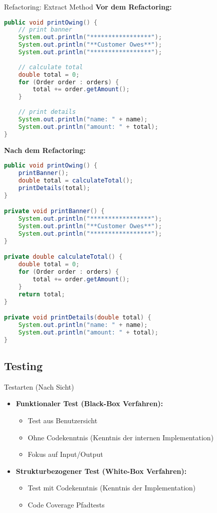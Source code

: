 \begin{example2}{Refactoring: Extract Method}
\textbf{Vor dem Refactoring:}
\begin{lstlisting}[language=Java, style=basesmol]
public void printOwing() {
    // print banner
    System.out.println("*****************");
    System.out.println("**Customer Owes**");
    System.out.println("*****************");
    
    // calculate total
    double total = 0;
    for (Order order : orders) {
        total += order.getAmount();
    }
    
    // print details
    System.out.println("name: " + name);
    System.out.println("amount: " + total);
}
\end{lstlisting}

\textbf{Nach dem Refactoring:}
\begin{lstlisting}[language=Java, style=basesmol]
public void printOwing() {
    printBanner();
    double total = calculateTotal();
    printDetails(total);
}

private void printBanner() {
    System.out.println("*****************");
    System.out.println("**Customer Owes**");
    System.out.println("*****************");
}

private double calculateTotal() {
    double total = 0;
    for (Order order : orders) {
        total += order.getAmount();
    }
    return total;
}

private void printDetails(double total) {
    System.out.println("name: " + name);
    System.out.println("amount: " + total);
}
\end{lstlisting}
\end{example2}

\pagebreak

\subsection{Testing}

\begin{definition}{Testarten} (Nach Sicht)
\begin{itemize}
    \item \textbf{Funktionaler Test (Black-Box Verfahren):} 
    \begin{itemize}
        \item Test aus Benutzersicht
        \item Ohne Codekenntnis (Kenntnis der internen Implementation)
        \item Fokus auf Input/Output
    \end{itemize}
    \item \textbf{Strukturbezogener Test (White-Box Verfahren):}
    \begin{itemize}
        \item Test mit Codekenntnis (Kenntnis der Implementation)
        \item Code Coverage Pfadtests
    \end{itemize}
\end{itemize}
\end{definition}

